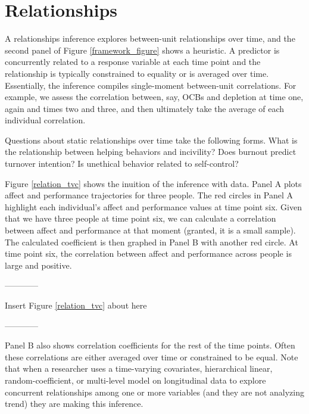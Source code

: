 \documentclass[english,,man]{apa6}
\theoremstyle{definition}
\theoremstyle{definition}
\theoremstyle{definition}
\theoremstyle{remark}
\begin{document}
\hypertarget{relationships}{%
\section{Relationships}\label{relationships}}

A relationships inference explores between-unit relationships over time,
and the second panel of Figure \ref{framework_figure} shows a heuristic.
A predictor is concurrently related to a response variable at each time
point and the relationship is typically constrained to equality or is
averaged over time. Essentially, the inference compiles single-moment
between-unit correlations. For example, we assess the correlation
between, say, OCBs and depletion at time one, again and times two and
three, and then ultimately take the average of each individual
correlation.

Questions about static relationships over time take the following forms.
What is the relationship between helping behaviors and incivility? Does
burnout predict turnover intention? Is unethical behavior related to
self-control?

Figure \ref{relation_tvc} shows the inuition of the inference with data.
Panel A plots affect and performance trajectories for three people. The
red circles in Panel A highlight each individual's affect and
performance values at time point six. Given that we have three people at
time point six, we can calculate a correlation between affect and
performance at that moment (granted, it is a small sample). The
calculated coefficient is then graphed in Panel B with another red
circle. At time point six, the correlation between affect and
performance across people is large and positive.

\begin{center}

------------

Insert Figure \ref{relation_tvc} about here

------------

\end{center}

Panel B also shows correlation coefficients for the rest of the time
points. Often these correlations are either averaged over time or
constrained to be equal. Note that when a researcher uses a time-varying
covariates, hierarchical linear, random-coefficient, or multi-level
model on longitudinal data to explore concurrent relationships among one
or more variables (and they are not analyzing trend) they are making
this inference.
\end{document}
